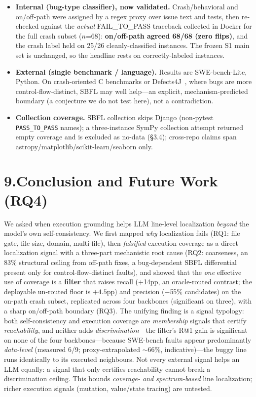\documentclass[11pt]{article}
\newcommand{\code}[1]{\texttt{#1}}
\begin{document}
\begin{itemize}
  \item \textbf{Internal (bug-type classifier), now validated.} Crash/behavioral and on/off-path were assigned by a regex proxy over issue text and tests, then re-checked against the \emph{actual} FAIL\_TO\_PASS traceback collected in Docker for the full crash subset ($n$=68): \textbf{on/off-path agreed 68/68 (zero flips)}, and the crash label held on 25/26 cleanly-classified instances. The frozen S1 main set is unchanged, so the headline rests on correctly-labeled instances.
  \item \textbf{External (single benchmark / language).} Results are SWE-bench-Lite, Python. On crash-oriented C benchmarks or Defects4J~\citep{defects4j}, where bugs are more control-flow-distinct, SBFL may well help---an explicit, mechanism-predicted boundary (a conjecture we do not test here), not a contradiction.
  \item \textbf{Collection coverage.} SBFL collection skips Django (non-pytest \code{PASS\_TO\_PASS} names); a three-instance SymPy collection attempt returned empty coverage and is excluded as no-data (\S3.4); cross-repo claims span astropy/matplotlib/scikit-learn/seaborn only.
\end{itemize}

\section*{9.\quad Conclusion and Future Work (RQ4)}

We asked when execution grounding helps LLM line-level localization \emph{beyond} the model's own self-consistency. We first mapped \emph{why} localization fails (RQ1: file gate, file size, domain, multi-file), then \emph{falsified} execution coverage as a direct localization signal with a three-part mechanistic root cause (RQ2: coarseness, an 83\% structural ceiling from off-path fixes, a bug-dependent SBFL differential present only for control-flow-distinct faults), and showed that the \emph{one} effective use of coverage is a \textbf{filter} that raises recall (+14pp, an oracle-routed contrast; the deployable un-routed floor is $+4.5$pp) and precision ($-$55\% candidates) on the on-path crash subset, replicated across four backbones (significant on three), with a sharp on/off-path boundary (RQ3). The unifying finding is a signal typology: both self-consistency and execution coverage are \emph{membership} signals that certify \emph{reachability}, and neither adds \emph{discrimination}---the filter's R@1 gain is significant on none of the four backbones---because SWE-bench faults appear predominantly \emph{data-level} (measured 6/9; proxy-extrapolated $\sim$66\%, indicative)---the buggy line runs identically to its executed neighbours. Not every external signal helps an LLM equally: a signal that only certifies reachability cannot break a discrimination ceiling. This bounds \emph{coverage- and spectrum-based} line localization; richer execution signals (mutation, value/state tracing) are untested.
\end{document}

